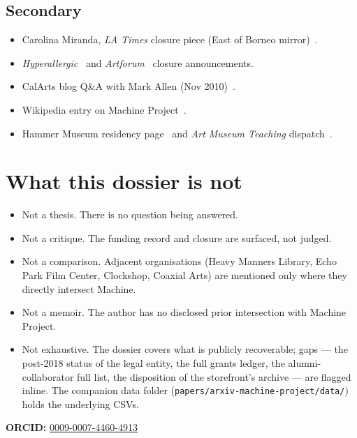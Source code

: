 \documentclass[10pt,letterpaper,twocolumn]{article}
\begin{document}
\subsection{Secondary}

\begin{itemize}
\item Carolina Miranda, \emph{LA Times} closure piece (East of Borneo mirror)~\citep{ltimesclosure}.
\item \emph{Hyperallergic}~\citep{hyperallergicclosure} and \emph{Artforum}~\citep{artforumclosure} closure announcements.
\item CalArts blog Q\&A with Mark Allen (Nov 2010)~\citep{calarts2010}.
\item Wikipedia entry on Machine Project~\citep{wikipediamachine}.
\item Hammer Museum residency page~\citep{hammerresidency} and \emph{Art Museum Teaching} dispatch~\citep{artmuseumteaching}.
\end{itemize}

\section{What this dossier is not}

\begin{itemize}
  \item Not a thesis. There is no question being answered.
  \item Not a critique. The funding record and closure are surfaced, not judged.
  \item Not a comparison. Adjacent organisations (Heavy Manners Library, Echo Park Film Center, Clockshop, Coaxial Arts) are mentioned only where they directly intersect Machine.
  \item Not a memoir. The author has no disclosed prior intersection with Machine Project.
  \item Not exhaustive. The dossier covers what is publicly recoverable; gaps --- the post-2018 status of the legal entity, the full grants ledger, the alumni-collaborator full list, the disposition of the storefront's archive --- are flagged inline. The companion data folder (\texttt{papers/arxiv-machine-project/data/}) holds the underlying CSVs.
\end{itemize}

\vspace{0.5em}
\noindent\textbf{ORCID:} \href{https://orcid.org/0009-0007-4460-4913}{0009-0007-4460-4913}



\end{document}

